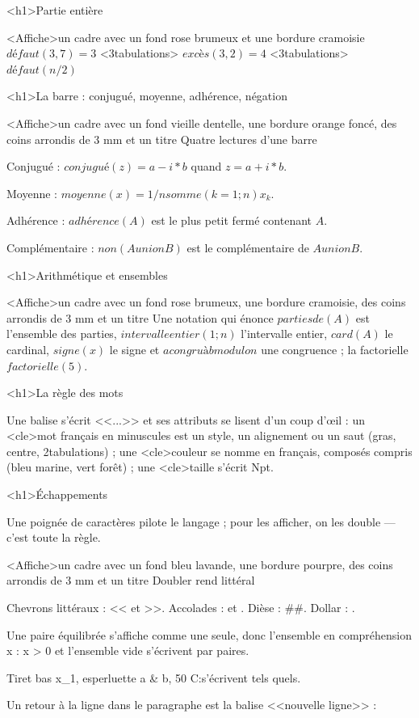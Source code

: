 \documentclass[marges=2, taille=11]{texecole}
\begin{document}
<h1>Partie entière

<Affiche>un cadre avec un fond rose brumeux et une bordure cramoisie {
	$défaut(3,7) = 3$ <3tabulations> $excès(3,2) = 4$ <3tabulations> $défaut(n/2)$
}

<h1>La barre : conjugué, moyenne, adhérence, négation

<Affiche>un cadre avec un fond vieille dentelle, une bordure orange foncé, des coins arrondis de 3 mm et un titre {Quatre lectures d'une barre} {
	Conjugué : $conjugué(z) = a - i*b$ quand $z = a + i*b$.

	Moyenne : $moyenne(x) = 1/n somme(k=1; n) x_k$.

	Adhérence : $adhérence(A)$ est le plus petit fermé contenant $A$.

	Complémentaire : $non(A union B)$ est le complémentaire de $A union B$.
}

<h1>Arithmétique et ensembles

<Affiche>un cadre avec un fond rose brumeux, une bordure cramoisie, des coins arrondis de 3 mm et un titre {Une notation qui énonce} {
	$parties de(A)$ est l'ensemble des parties, $intervalle entier(1; n)$ l'intervalle
	entier, $card(A)$ le cardinal, $signe(x)$ le signe et
	$a congru à b modulo n$ une congruence ; la factorielle $factorielle(5)$.
}

<h1>La règle des mots

Une balise s'écrit <<...>> et ses attributs se lisent d'un coup d'œil :
un <cle>{mot français en minuscules} est un style, un alignement ou un saut (gras, centre, 2tabulations) ; une <cle>{couleur} se nomme en français, composés compris (bleu marine, vert forêt) ; une
<cle>{taille} s'écrit Npt.

<h1>Échappements

Une poignée de caractères pilote le langage ; pour les afficher, on les double — c'est toute la règle.

<Affiche>un cadre avec un fond bleu lavande, une bordure pourpre, des coins arrondis de 3 mm et un titre {Doubler rend littéral} {
	Chevrons littéraux : << et >>. Accolades : {{ et }}. Dièse : ##. Dollar : $$.

	Une paire équilibrée s'affiche comme une seule, donc l'ensemble en
	compréhension {{ x : x > 0 }} et l'ensemble vide {{}} s'écrivent
	par paires.

	Tiret bas x_1, esperluette a & b, 50%
	C:\Users{}\Documents s'écrivent tels quels.
}

Un retour à la ligne dans le paragraphe est la balise <<nouvelle ligne>> :
\end{document}
